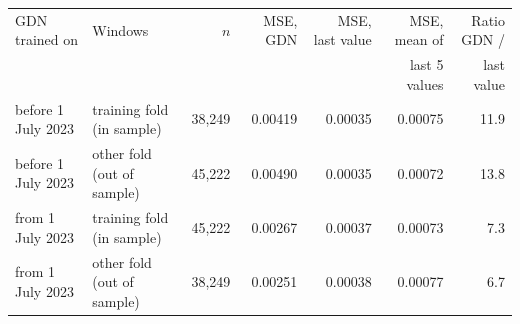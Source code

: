 \documentclass[11pt,a4paper]{article}
\makeatletter
\newenvironment{stable}{\par\addvspace{8pt}\noindent\begin{minipage}{\textwidth}\def\@captype{table}\centering}{\end{minipage}\par\addvspace{8pt}}
\makeatother
\begin{document}
\begin{stable}
\caption{GDN's one-step forecasts against two naive forecasts on clean windows of the real southern series, for the two cross-fitted models (mean squared error of $\rho$). On clean data GDN's forecasts are 7--14 times worse than the last value.}\label{tab:s-gdn-forecast}
\scriptsize\setlength{\tabcolsep}{4pt}
\begin{tabular}{@{}l l r r r r r@{}}
\toprule
GDN trained on & Windows & $n$ & MSE, GDN & MSE, last value & MSE, mean of & Ratio GDN / \\
 & & & & & last 5 values & last value \\
\midrule
before 1 July 2023 & training fold (in sample) & 38,249 & 0.00419 & 0.00035 & 0.00075 & 11.9 \\
before 1 July 2023 & other fold (out of sample) & 45,222 & 0.00490 & 0.00035 & 0.00072 & 13.8 \\
from 1 July 2023 & training fold (in sample) & 45,222 & 0.00267 & 0.00037 & 0.00073 & 7.3 \\
from 1 July 2023 & other fold (out of sample) & 38,249 & 0.00251 & 0.00038 & 0.00077 & 6.7 \\
\bottomrule
\end{tabular}
\end{stable}
\end{document}
